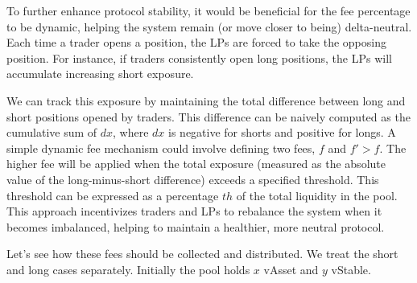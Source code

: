 \documentclass{article}
\begin{document}
To further enhance protocol stability, it would be beneficial for the fee percentage to be
dynamic, helping the system remain (or move closer to being) delta-neutral. Each time a
trader opens a position, the LPs are forced to take the opposing position. For instance, if
traders consistently open long positions, the LPs will accumulate increasing short exposure.

We can track this exposure by maintaining the total difference between long and short
positions opened by traders. This difference can be naively computed as the cumulative sum
of $dx$, where $dx$ is negative for shorts and positive for longs. A simple dynamic fee
mechanism could involve defining two fees, $f$ and $f' > f$. The higher fee will be applied
when the total exposure (measured as the absolute value of the long-minus-short difference)
exceeds a specified threshold. This threshold can be expressed as a percentage $th$ of the
total liquidity in the pool. This approach incentivizes traders and LPs to rebalance the
system when it becomes imbalanced, helping to maintain a healthier, more neutral protocol.

Let's see how these fees should be collected and distributed. We treat the short and long
cases separately. Initially the pool holds $x$ vAsset and $y$ vStable.
\end{document}

